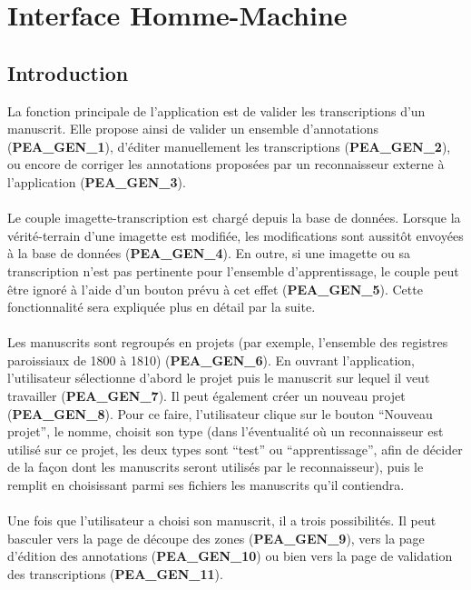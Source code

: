\section{Interface Homme-Machine}

\subsection{Introduction}

La fonction principale de l’application est de valider les transcriptions d’un
manuscrit. Elle propose ainsi de valider un ensemble d’annotations
(\textbf{PEA\_GEN\_1}), d’éditer manuellement les transcriptions
(\textbf{PEA\_GEN\_2}), ou encore de corriger les annotations proposées par un
reconnaisseur externe à l’application (\textbf{PEA\_GEN\_3}).

\paragraph{}
Le couple imagette-transcription est chargé depuis la base de données. Lorsque
la vérité-terrain d’une imagette est modifiée, les modifications sont aussitôt
envoyées à la base de données (\textbf{PEA\_GEN\_4}). En outre, si une
imagette ou sa transcription n’est pas pertinente pour l’ensemble
d’apprentissage, le couple peut être ignoré à l’aide d’un bouton prévu à cet
effet (\textbf{PEA\_GEN\_5}). Cette fonctionnalité sera expliquée plus en
détail par la suite.

\paragraph{}
Les manuscrits sont regroupés en projets (par exemple, l’ensemble des registres
paroissiaux de 1800 à 1810) (\textbf{PEA\_GEN\_6}). En ouvrant l’application,
l’utilisateur sélectionne d’abord le projet puis le manuscrit sur lequel il
veut travailler (\textbf{PEA\_GEN\_7}). Il peut également créer un nouveau
projet (\textbf{PEA\_GEN\_8}). Pour ce faire, l’utilisateur clique sur le
bouton “Nouveau projet”, le nomme, choisit son type (dans l’éventualité où un
reconnaisseur est utilisé sur ce projet, les deux types sont “test” ou
“apprentissage”, afin de décider de la façon dont les manuscrits seront
utilisés par le reconnaisseur), puis le remplit en choisissant parmi ses
fichiers les manuscrits qu’il contiendra.

\paragraph{}
Une fois que l’utilisateur a choisi son manuscrit, il a trois possibilités.
Il peut basculer vers la page de découpe des zones (\textbf{PEA\_GEN\_9}), vers
la page d’édition des annotations (\textbf{PEA\_GEN\_10}) ou bien vers la page
de validation des transcriptions (\textbf{PEA\_GEN\_11}).

